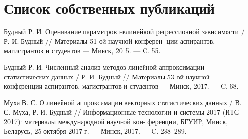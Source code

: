 \chapter*{Список собственных публикаций}

\noindent [1"---A.] Будный Р. И.
Оценивание параметров нелинейной регрессионной
\hspace*{16.5mm} зависимости / Р. И. Будный // Материалы 51-ой научной конферен-
\hspace*{17mm} ции аспирантов, магистрантов и студентов --- Минск, 2015. --- C. 55.

\noindent [2"---A.] Будный Р. И.
Численный анализ методов линейной аппроксимации
\hspace*{15.5mm} статистических данных / Р. И. Будный // Материалы 53-ой научной
\hspace*{16mm} конференции аспирантов, магистрантов и студентов --- Минск, 2017.
\hspace*{16.5mm} --- C. 68.

\noindent [3"---A.] Муха В. С.
О линейной аппроксимации векторных статистических
\hspace*{15.5mm} данных / В. С. Муха, Р. И. Будный // Информационные технологии
\hspace*{16.5mm} и системы 2017 (ИТС 2017): материалы международной научной кон-
\hspace*{15.5mm} ференции, БГУИР, Минск, Беларусь, 25 октября 2017 г. --- Минск,
\hspace*{16.5mm} 2017. --- C. 288--289.

